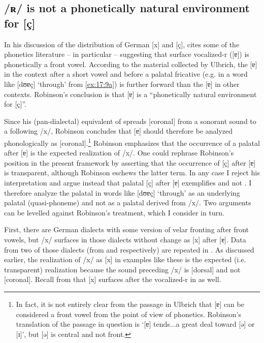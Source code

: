 \subsection{/ʀ/ is not a phonetically natural environment for [ç]}\label{sec:17.3.1}

In his discussion of the distribution of German [x] and [ç], \citet[78--81]{Robinson1992} cites some of the phonetics literature -- in particular \citet{Ulbrich1972} -- suggesting that surface vocalized-r ([ɐ]) is phonetically a front vowel. According to the material collected by Ulbrich, the [ɐ] in the context after a short vowel and before a palatal fricative (e.g. in a word like [dʊɐç] ‘through’ from \ref{ex:17:9a}) is further forward than the [ɐ] in other contexts. Robinson’s conclusion is that [ɐ] is a “phonetically natural environment for [ç]”.

Since his (pan-dialectal) equivalent of  spreads [coronal] from a sonorant sound to a following /x/, Robinson concludes that [ɐ] should therefore be analyzed phonologically as [coronal].\footnote{{In fact, it is not entirely clear from the passage in Ulbrich that [ɐ] can be considered a front vowel from the point of view of phonetics. Robinson’s translation of the passage in question is ‘[ɐ] tends...a great deal toward [ə] or [ɪ]’, but [ə] is central and not front.}} Robinson emphasizes that the occurrence of a palatal after [ɐ] is the expected realization of /x/. One could rephrase Robinson’s position in the present framework by asserting that the occurrence of [ç] after [ɐ] is transparent, although Robinson eschews the latter term. In any case I reject his interpretation and argue instead that palatal [ç] after [ɐ] exemplifies  and not . I therefore analyze the palatal in words like [dʊɐç] ‘through’ as an underlying palatal (quasi-phoneme) and not as a palatal derived from /x/. Two arguments can be levelled against Robinson’s treatment, which I consider in turn.

First, there are German dialects with some version of velar fronting after front vowels, but /x/ surfaces in those dialects without change as [x] after [ɐ]. Data from two of those dialects (from  and  respectively) are repeated in . As discussed earlier, the realization of /x/ as [x] in examples like these is the expected (i.e. transparent) realization because the sound preceding /x/ is [dorsal] and not [coronal]. Recall from  that [x] surfaces after the vocalized-r in  as well.

